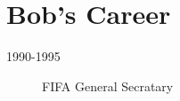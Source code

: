 \section{Bob's Career}

\begin{description}

\item[1990-1995] FIFA General Secratary

\end{description}